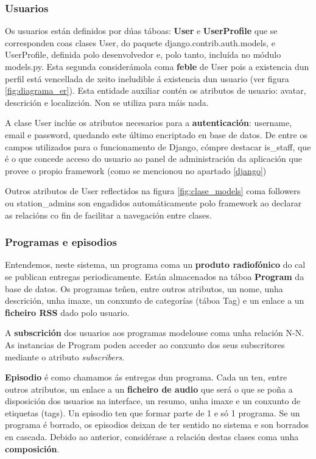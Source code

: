 \subsubsection{Usuarios}

Os usuarios están definidos por dúas táboas: \textbf{User} e \textbf{UserProfile} que se corresponden coas clases User, do paquete django.contrib.auth.models, e UserProfile, definida polo desenvolvedor e, polo tanto, incluída no módulo models.py. Esta segunda considerámola coma \textbf{feble} de User pois a existencia dun perfil está vencellada de xeito ineludible á existencia dun usuario (ver figura \ref{fig:diagrama_er}). Esta entidade auxiliar contén os atributos de usuario: avatar, descrición e localizción. Non se utiliza para máis nada.

A clase User inclúe os atributos necesarios para a \textbf{autenticación}: username, email e password, quedando este último encriptado en base de datos. De entre os campos utilizados para o funcionamento de Django, cómpre destacar is\_staff, que é o que concede acceso do usuario ao panel de administración da aplicación que provee o propio framework (como se mencionou no apartado \ref{django})

Outros atributos de User reflectidos na figura \ref{fig:clase_models} coma followers ou station\_admins son engadidos automáticamente polo framework ao declarar as relacións co fin de facilitar a navegación entre clases.


\subsubsection{Programas e episodios}

Entendemos, neste sistema, un programa coma un \textbf{produto radiofónico} do cal se publican entregas periodicamente. Están almacenados na táboa \textbf{Program} da base de datos. Os programas teñen, entre outros atributos, un nome, unha descrición, unha imaxe, un conxunto de categorías (táboa Tag) e un enlace a un \textbf{ficheiro RSS} dado polo usuario.

A \textbf{subscrición} dos usuarios aos programas modelouse coma unha relación N-N. As instancias de Program poden acceder ao conxunto dos seus subscritores mediante o atributo \textit{subscribers}.

\textbf{Episodio} é como chamamos ás entregas dun programa. Cada un ten, entre outros atributos, un enlace a un \textbf{ficheiro de audio} que será o que se poña a disposición dos usuarios na interface, un resumo, unha imaxe e un conxunto de etiquetas (tags). Un episodio ten que formar parte de 1 e só 1 programa. Se un programa é borrado, os episodios deixan de ter sentido no sistema e son borrados en cascada. Debido ao anterior, considérase a relación destas clases coma unha \textbf{composición}.


